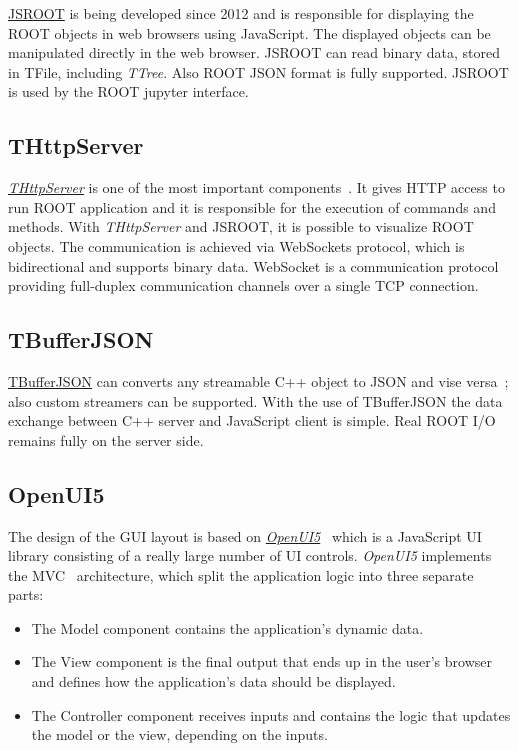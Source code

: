 \documentclass[a4paper]{jpconf}
\begin{document}
\href{https://github.com/root-project/jsroot/}{JSROOT} is being developed since
2012 and is responsible for displaying the ROOT objects in web browsers using
JavaScript. The displayed objects can be manipulated directly in
the web browser. JSROOT can read binary data, stored in TFile, including \textit{TTree}.
Also ROOT JSON format is fully supported. JSROOT is used by the ROOT jupyter interface.

\subsection{THttpServer}

\href{https://github.com/root-project/jsroot/blob/master/docs/HttpServer.md}{{\it THttpServer}} is
one of the most important components~\cite{http}. It gives HTTP access to run ROOT application
and it is responsible for the execution of commands and methods. With {\it THttpServer}
and JSROOT, it is possible to visualize ROOT objects. The communication is achieved
via WebSockets protocol, which is bidirectional and supports binary data. WebSocket
is a communication protocol providing full-duplex communication channels over a
single TCP connection.

\subsection{TBufferJSON}

\href{https://root.cern.ch/doc/master/classTBufferJSON.html}{TBufferJSON} can converts
any streamable C++ object to JSON and vise versa~\cite{buffer}; also custom streamers
can be supported. With the use of TBufferJSON the data exchange between C++ server
and JavaScript client is simple. Real ROOT I/O remains fully on the server side.

\subsection{OpenUI5}
The design of the GUI layout is based on \textit{\href{https://openui5.hana.ondemand.com/}{OpenUI5}}~\cite{openui}
which is a JavaScript UI library consisting of a really large number of UI controls.
\textit{OpenUI5} implements the MVC~\cite{mvc} architecture, which split
the application logic into three separate parts:
\begin{itemize}
  \item The Model component contains the application's dynamic data.
  \item The View component is the final output that ends up in the user's browser and defines how the application's data should be displayed.
  \item The Controller component receives inputs and contains the logic that updates the model or the view, depending on the inputs.
\end{itemize}
\end{document}
